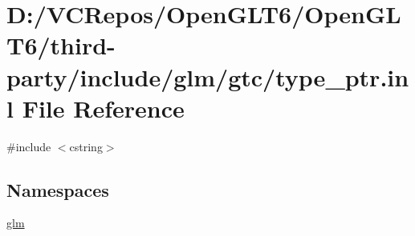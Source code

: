 \hypertarget{type__ptr_8inl}{}\section{D\+:/\+V\+C\+Repos/\+Open\+G\+L\+T6/\+Open\+G\+L\+T6/third-\/party/include/glm/gtc/type\+\_\+ptr.inl File Reference}
\label{type__ptr_8inl}
{\ttfamily \#include $<$cstring$>$}\newline
\subsection*{Namespaces}
\begin{DoxyCompactItemize}
\item 
 \mbox{\hyperlink{namespaceglm}{glm}}
\end{DoxyCompactItemize}
